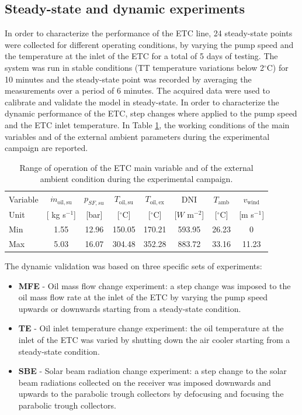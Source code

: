 \documentclass[final,3p,times,review]{elsarticle}
\begin{document}
\subsection{Steady-state and dynamic experiments}
%
In order to characterize the performance of the ETC line, 24 steady-state points were collected for different operating conditions, by varying the pump speed and the temperature at the inlet of the ETC for a total of 5 days of testing. The system was run in stable conditions (TT temperature variations
below 2$^{\circ}$C) for 10 minutes and the steady-state point was recorded by averaging the measurements over a period of 6 minutes. The acquired data were used to calibrate and validate the model in steady-state.
In order to characterize the dynamic performance of the ETC, step changes where applied to the pump speed and the ETC inlet temperature. In Table \ref{Tab:SF_workCond}, the working conditions of the main variables and of the external ambient parameters during the experimental campaign are reported. 
%
\begin{table}[h!]
\centering
\caption{Range of operation of the ETC main variable and of the external ambient condition during the experimental campaign.}
\begin{tabular}{lccccccc}
\toprule
 Variable & $\dot{m}_\mathrm{oil,su}$ & $p_{SF,su}$  &$T_\mathrm{oil,su}$  & $T_\mathrm{oil,ex}$ &  DNI &  $T_\mathrm{amb}$ & $v_\mathrm{wind}$ \\
Unit &  [ kg s$^{-1}$] & [bar] & [$^{\circ}$C] &  [$^{\circ}$C]&  [$W$ m$^{-2}$] &  [$^{\circ}$C] &  [m s$^{-1}$] \\
\toprule
Min & 1.55      &   12.96 & 150.05  &   170.21  &   593.95  &   26.23 &   0  \\
Max & 5.03      &   16.07 & 304.48  &   352.28  &   883.72  &   33.16 &   11.23  \\
\bottomrule
\end{tabular}
\label{Tab:SF_workCond}
\end{table}
%
The dynamic validation was based on three specific sets of experiments:
%
\begin{itemize}
\item \textbf{MFE} - Oil mass flow change experiment: a step change was imposed to the oil mass flow rate at the inlet of the ETC by varying the pump speed upwards or downwards starting from a steady-state condition.
\item \textbf{TE} - Oil inlet temperature change experiment: the oil temperature at the inlet of the ETC was varied by shutting down the air cooler starting from a steady-state condition. 
\item \textbf{SBE} - Solar beam radiation change experiment: a step change to the solar beam radiations  collected on the receiver was imposed downwards and upwards to the parabolic trough collectors by defocusing and focusing the parabolic trough collectors.
\end{itemize} 
%
\end{document}
